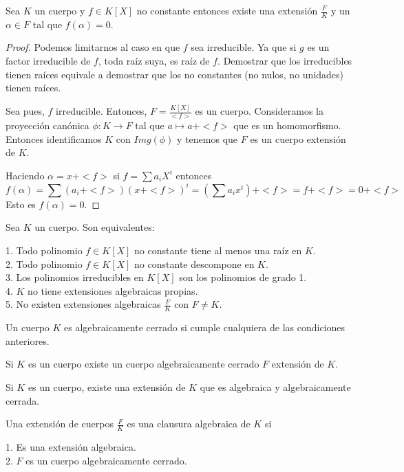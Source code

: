 \begin{theorem}
Sea $K$ un cuerpo y $f \in K[X]$ no constante entonces existe una extensión $\frac{F}{K}$ y un $\alpha \in F$ tal que $f(\alpha) = 0$. 
\end{theorem}
\begin{proof}
Podemos limitarnos al caso en que $f$ sea irreducible. Ya que si $g$ es un factor irreducible de $f$, toda raíz suya, es raíz de $f$. Demostrar que los irreducibles tienen raíces equivale a demostrar que los no constantes (no nulos, no unidades) tienen raíces. 

Sea pues, $f$ irreducible. Entonces, $F = \frac{K[X]}{<f>}$ es un cuerpo. Consideramos la proyección canónica $\phi:K \to F$ tal que $a \mapsto a + <f>$ que es un homomorfismo. Entonces identificamos $K$ con $Img(\phi)$ y tenemos que $F$ es un cuerpo extensión de $K$. 

Haciendo $\alpha = x + <f>$ si $f = \sum a_i X^i$ entonces $$f(\alpha) = \sum (a_i+<f>)(x+<f>)^i = (\sum a_ix^i) + <f> = f+<f> = 0 + <f>$$ Esto es $f(\alpha) = 0$.  
\end{proof}

\begin{lemma}
	Sea $K$ un cuerpo. Son equivalentes:
	
	1. Todo polinomio $f  \in K[X]$ no constante tiene al menos una raíz en $K$.\\
	2. Todo polinomio $f  \in K[X]$ no constante descompone en $K$. \\
	3. Los polinomios irreducibles en $K[X]$ son los polinomios de grado 1. \\
	4. $K$ no tiene extensiones algebraicas propias. \\
	5. No existen extensiones algebraicas $\frac{F}{K}$ con $F \neq K$. 
\end{lemma}


\begin{definition}
	Un cuerpo $K$ es algebraicamente cerrado si cumple cualquiera de las condiciones anteriores. 
\end{definition}

\begin{theorem}
	Si $K$ es un cuerpo existe un cuerpo algebraicamente cerrado $F$ extensión de $K$. 
\end{theorem}

\begin{corollary}
	Si $K$ es un cuerpo, existe una extensión de $K$ que es algebraica y algebraicamente cerrada. 	
\end{corollary}

\begin{definition}
	Una extensión de cuerpos $\frac{F}{K}$ es una clausura algebraica de $K$ si 
	
	1. Es una extensión algebraica. \\
	2. $F$ es un cuerpo algebraicamente cerrado. 
\end{definition}



